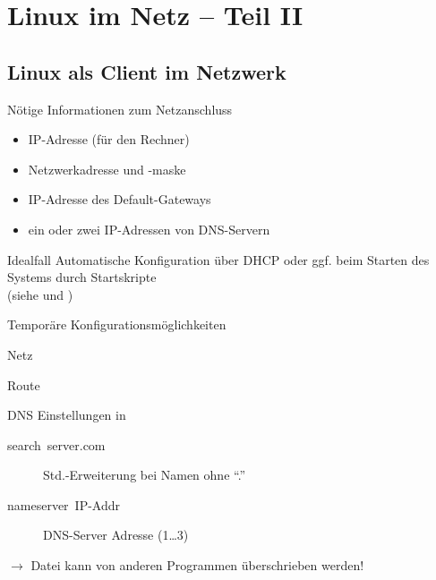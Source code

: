 \documentclass[aspectratio=43]{beamer}
\begin{document}
\section{Linux im Netz -- Teil II}
\subsection{Linux als Client im Netzwerk}
\begin{frame}{}
  \begin{alertblock}{Nötige Informationen zum Netzanschluss}
    \begin{itemize}
      \item IP-Adresse (für den Rechner)
      \item Netzwerkadresse und -maske
      \item IP-Adresse des Default-Gateways
      \item ein oder zwei IP-Adressen von DNS-Servern
    \end{itemize}
  \end{alertblock}
  \begin{exampleblock}{Idealfall}
    Automatische Konfiguration über DHCP oder ggf. beim Starten des Systems durch Startskripte\\[.7em]
    {\color{gray}(siehe  und )}
  \end{exampleblock}
\end{frame}

\begin{frame}{Temporäre Konfigurationsmöglichkeiten}
  \hspace*{-2em}
  \begin{block}{Netz}
    \\
  \end{block}
  \begin{block}{Route}
    \\
  \end{block}
  \begin{block}{DNS Einstellungen in }
    \begin{description}
      \item[search~server.com ] Std.-Erweiterung bei Namen ohne ``.''
      \item[nameserver~IP-Addr] DNS-Server Adresse (1\dots 3)
    \end{description}
    $\rightarrow$ Datei kann von anderen Programmen überschrieben werden!
  \end{block}
\end{frame}
\end{document}

